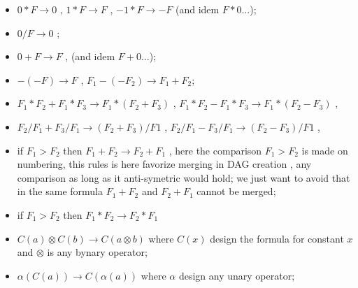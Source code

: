 \begin{itemize}
     \item  $0*F \rightarrow 0$ ,   $1*F  \rightarrow F$ , $-1*F \rightarrow -F$ (and idem $F*0\dots$);

     \item  $0/F \rightarrow 0$ ;

     \item  $0+F \rightarrow F$ ,   (and idem $F+0\dots$);

     \item  $-(-F) \rightarrow F$ ,  $F_1-(-F_2) \rightarrow F_1+F_2$;

     \item  $F_1*F_2 + F_1*F_3  \rightarrow F_1*(F_2+F_3)$ , $F_1*F_2 - F_1*F_3  \rightarrow F_1*(F_2-F_3)$ , 
     \item  $F_2/F_1 + F_3/F_1  \rightarrow (F_2+F_3)/F1$ ,  $F_2/F_1 - F_3/F_1  \rightarrow (F_2-F_3)/F1$ , 

     \item if  $F_1 > F_2$ then  $F_1 + F_2  \rightarrow F_2 + F_1$ , here the comparison $F_1 > F_2$ 
           is made on numbering, this rules is here favorize merging in DAG creation , any comparison as long
           as it anti-symetric would hold; we just want to avoid that in the same formula $F_1+F_2$ and $F_2+F_1$
	   cannot be merged;
     \item if  $F_1 > F_2$ then  $F_1 * F_2  \rightarrow F_2 * F_1$ 

     \item  $C(a) \otimes C(b) \rightarrow C(a \otimes b) $  where  $C(x)$ design the formula for constant $x$
	     and $\otimes$ is any bynary operator;
     \item  $ \alpha (C(a)) \rightarrow C(\alpha (a)) $  where  $\alpha$ design any unary operator;

\end{itemize}





